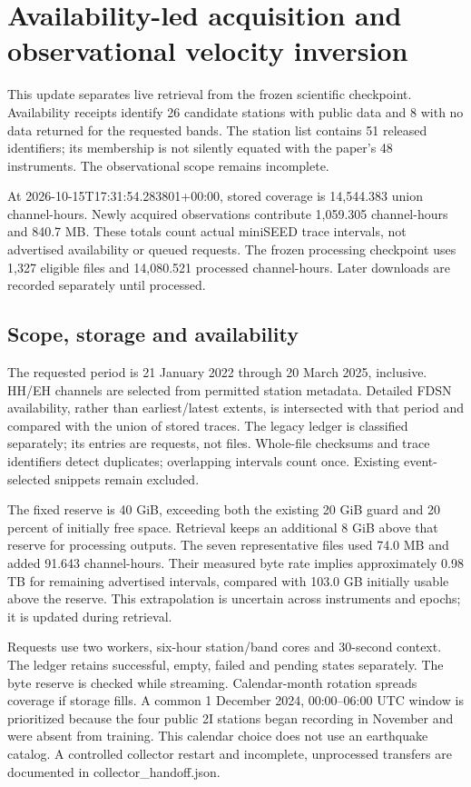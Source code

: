 \section*{Availability-led acquisition and observational velocity inversion}

This update separates live retrieval from the frozen scientific checkpoint. Availability receipts identify 26 candidate stations with public data and 8 with no data returned for the requested bands. The station list contains 51 released identifiers; its membership is not silently equated with the paper's 48 instruments. The observational scope remains incomplete.

At 2026-10-15T17:31:54.283801+00:00, stored coverage is 14,544.383 union channel-hours. Newly acquired observations contribute 1,059.305 channel-hours and 840.7 MB. These totals count actual miniSEED trace intervals, not advertised availability or queued requests. The frozen processing checkpoint uses 1,327 eligible files and 14,080.521 processed channel-hours. Later downloads are recorded separately until processed.

\subsection*{Scope, storage and availability}

The requested period is 21 January 2022 through 20 March 2025, inclusive. HH/EH channels are selected from permitted station metadata. Detailed FDSN availability, rather than earliest/latest extents, is intersected with that period and compared with the union of stored traces. The legacy ledger is classified separately; its entries are requests, not files. Whole-file checksums and trace identifiers detect duplicates; overlapping intervals count once. Existing event-selected snippets remain excluded.

The fixed reserve is 40 GiB, exceeding both the existing 20 GiB guard and 20 percent of initially free space. Retrieval keeps an additional 8 GiB above that reserve for processing outputs. The seven representative files used 74.0 MB and added 91.643 channel-hours. Their measured byte rate implies approximately 0.98 TB for remaining advertised intervals, compared with 103.0 GB initially usable above the reserve. This extrapolation is uncertain across instruments and epochs; it is updated during retrieval.

Requests use two workers, six-hour station/band cores and 30-second context. The ledger retains successful, empty, failed and pending states separately. The byte reserve is checked while streaming. Calendar-month rotation spreads coverage if storage fills. A common 1 December 2024, 00:00--06:00 UTC window is prioritized because the four public 2I stations began recording in November and were absent from training. This calendar choice does not use an earthquake catalog. A controlled collector restart and incomplete, unprocessed transfers are documented in collector\_handoff.json.

